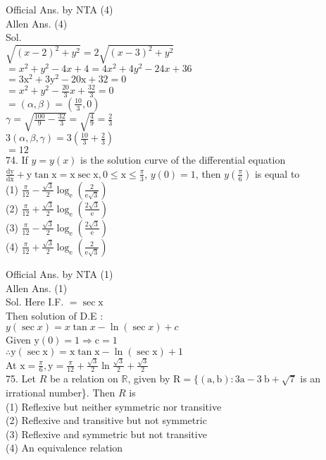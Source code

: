 \documentclass[10pt]{article}
\begin{document}
Official Ans. by NTA (4)\\
Allen Ans. (4)\\
Sol.\\
\(\sqrt{(x-2)^{2}+y^{2}}=2 \sqrt{(x-3)^{2}+y^{2}}\)\\
\(=x^{2}+y^{2}-4 x+4=4 x^{2}+4 y^{2}-24 x+36\)\\
\(=3 \mathrm{x}^{2}+3 \mathrm{y}^{2}-20 \mathrm{x}+32=0\)\\
\(=x^{2}+y^{2}-\frac{20}{3} x+\frac{32}{3}=0\)\\
\(=(\alpha, \beta)=\left(\frac{10}{3}, 0\right)\)\\
\(\gamma=\sqrt{\frac{100}{9}-\frac{32}{3}}=\sqrt{\frac{4}{9}}=\frac{2}{3}\)\\
\(3(\alpha, \beta, \gamma)=3\left(\frac{10}{3}+\frac{2}{3}\right)\)\\
\(=12\)\\
74. If \(y=y(x)\) is the solution curve of the differential equation \(\frac{\mathrm{dy}}{\mathrm{dx}}+\mathrm{y} \tan \mathrm{x}=\mathrm{x} \sec \mathrm{x}, 0 \leq \mathrm{x} \leq \frac{\pi}{3}\), \(y(0)=1\), then \(y\left(\frac{\pi}{6}\right)\) is equal to\\
(1) \(\frac{\pi}{12}-\frac{\sqrt{3}}{2} \log _{\mathrm{e}}\left(\frac{2}{\mathrm{e} \sqrt{3}}\right)\)\\
(2) \(\frac{\pi}{12}+\frac{\sqrt{3}}{2} \log _{\mathrm{e}}\left(\frac{2 \sqrt{3}}{\mathrm{e}}\right)\)\\
(3) \(\frac{\pi}{12}-\frac{\sqrt{3}}{2} \log _{\mathrm{e}}\left(\frac{2 \sqrt{3}}{\mathrm{e}}\right)\)\\
(4) \(\frac{\pi}{12}+\frac{\sqrt{3}}{2} \log _{\mathrm{e}}\left(\frac{2}{\mathrm{e} \sqrt{3}}\right)\)

Official Ans. by NTA (1)\\
Allen Ans. (1)\\
Sol. Here I.F. \(=\sec \mathrm{x}\)\\
Then solution of D.E :\\
\(y(\sec x)=x \tan x-\ln (\sec x)+c\)\\
Given \(\mathrm{y}(0)=1 \Rightarrow \mathrm{c}=1\)\\
\(\therefore \mathrm{y}(\sec \mathrm{x})=\mathrm{x} \tan \mathrm{x}-\ln (\sec \mathrm{x})+1\)\\
At \(\mathrm{x}=\frac{\pi}{6}, \mathrm{y}=\frac{\pi}{12}+\frac{\sqrt{3}}{2} \ln \frac{\sqrt{3}}{2}+\frac{\sqrt{3}}{2}\)\\
75. Let \(R\) be a relation on \(\mathbb{R}\), given by \(\mathrm{R}=\{(\mathrm{a}, \mathrm{b}): 3 \mathrm{a}-3 \mathrm{~b}+\sqrt{7}\) is an irrational number\}. Then \(R\) is\\
(1) Reflexive but neither symmetric nor transitive\\
(2) Reflexive and transitive but not symmetric\\
(3) Reflexive and symmetric but not transitive\\
(4) An equivalence relation
\end{document}
